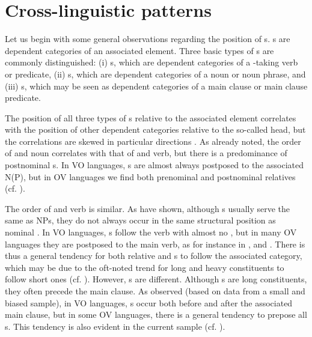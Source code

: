 \documentclass[output=paper]{langsci/langscibook}
\begin{document}
\section{Cross-linguistic patterns}\label{sec:diessel:2}

Let us begin with some general observations regarding the position of s. s are dependent categories of an associated element. Three basic types of s are commonly distinguished: 
(i) s, which are dependent categories of a -taking verb or predicate, 
(ii) s, which are dependent categories of a noun or noun phrase, and 
(iii) s, which may be seen as dependent categories of a main clause or main clause predicate. 

The position of all three types of s relative to the associated element correlates with the position of other dependent categories relative to the so-called head, but the correlations are skewed in particular directions \citep{Diessel2001}. As \citet{Greenberg1963} already noted, the order of  and noun correlates with that of  and verb, but there is a predominance of postnominal s. In VO languages, s are almost always postposed to the associated N(P), but in OV languages we find both prenominal and postnominal relatives (cf. \citealt{Dryer2005_Rel}). 

The order of  and verb is similar. As \citet{Schmidtke-BodeDiessel2017} have shown, although  s usually serve the same  as  NPs, they do not always occur in the same structural position as nominal . In VO languages, s follow the verb with almost no , but in many OV languages they are postposed to the main verb, as for instance in ,  and . There is thus a general tendency for both relative and s to follow the associated category, which may be due to the oft-noted trend for long and heavy constituents to follow short ones (cf. \citealt{Behaghel1932}).
\newpage
However, s are different. Although s are long constituents, they often precede the main clause. As \citet{Diessel2001} observed (based on data from a small and biased sample), in VO languages, s occur both before and after the associated main clause, but in some OV languages, there is a general tendency to prepose all s. This tendency is also evident in the current sample (cf. ).
\end{document}

